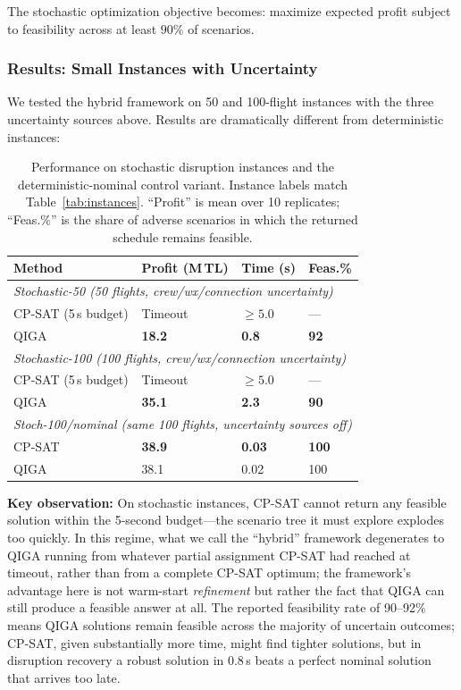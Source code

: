 \documentclass[12pt,number]{elsarticle}
\begin{document}
The stochastic optimization objective becomes: maximize expected profit subject to feasibility across at least $90\%$ of scenarios.

\subsubsection{Results: Small Instances with Uncertainty}

We tested the hybrid framework on 50 and 100-flight instances with the three uncertainty sources above. Results are dramatically different from deterministic instances:

\begin{table}[H]
\centering
\caption{Performance on stochastic disruption instances and the deterministic-nominal control variant. Instance labels match Table~\ref{tab:instances}. ``Profit'' is mean over 10 replicates; ``Feas.\%'' is the share of adverse scenarios in which the returned schedule remains feasible.}
\label{tab:stochastic}
\small
\begin{tabular}{@{}p{2.7cm}p{2.4cm}p{1.8cm}p{1.8cm}@{}}
\toprule
\textbf{Method} & \textbf{Profit (M\,TL)} & \textbf{Time (s)} & \textbf{Feas.\%} \\
\midrule
\multicolumn{4}{l}{\textit{Stochastic-50 (50 flights, crew/wx/connection uncertainty)}} \\
CP-SAT (5\,s budget) & Timeout       & $\geq 5.0$ & --- \\
QIGA                 & \textbf{18.2} & \textbf{0.8} & \textbf{92} \\
\midrule
\multicolumn{4}{l}{\textit{Stochastic-100 (100 flights, crew/wx/connection uncertainty)}} \\
CP-SAT (5\,s budget) & Timeout       & $\geq 5.0$ & --- \\
QIGA                 & \textbf{35.1} & \textbf{2.3} & \textbf{90} \\
\midrule
\multicolumn{4}{l}{\textit{Stoch-100/nominal (same 100 flights, uncertainty sources off)}} \\
CP-SAT               & \textbf{38.9} & \textbf{0.03} & \textbf{100} \\
QIGA                 & 38.1          & 0.02 & 100 \\
\bottomrule
\end{tabular}\normalsize
\end{table}

\textbf{Key observation:} On stochastic instances, CP-SAT cannot return any feasible solution within the 5-second budget---the scenario tree it must explore explodes too quickly. In this regime, what we call the ``hybrid'' framework degenerates to QIGA running from whatever partial assignment CP-SAT had reached at timeout, rather than from a complete CP-SAT optimum; the framework's advantage here is not warm-start \emph{refinement} but rather the fact that QIGA can still produce a feasible answer at all. The reported feasibility rate of 90--92\% means QIGA solutions remain feasible across the majority of uncertain outcomes; CP-SAT, given substantially more time, might find tighter solutions, but in disruption recovery a robust solution in 0.8\,s beats a perfect nominal solution that arrives too late.
\end{document}
